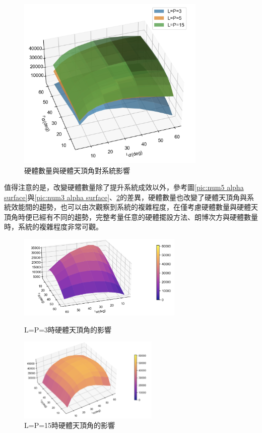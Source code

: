 \begin{figure}[htpb]
    \centering
    \includegraphics[width=9cm]{ch4pic/alpha_effect.png}
    \caption{硬體數量與硬體天頂角對系統影響}
    \label{pic:alpha_effect}
\end{figure}

值得注意的是，改變硬體數量除了提升系統成效以外，參考圖\ref{pic:num5 alpha surface}與\ref{pic:num3 alpha surface}、\ref{pic:num15 alpha surface}的差異，硬體數量也改變了硬體天頂角與系統效能間的趨勢，也可以由次觀察到系統的複雜程度，在僅考慮硬體數量與硬體天頂角時便已經有不同的趨勢，完整考量任意的硬體擺設方法、朗博次方與硬體數量時，系統的複雜程度非常可觀。

\begin{figure}[htpb]
    \centering
    \begin{minipage}{.5\textwidth}
        \centering
        \includegraphics[height=4cm]{ch4pic/num3 alpha surface.png}
        \caption{L=P=3時硬體天頂角的影響}
        \label{pic:num3 alpha surface}
    \end{minipage}%
    \begin{minipage}{0.5\textwidth}
        \centering
        \includegraphics[height=4cm]{ch4pic/num15 alpha surface.png}
        \caption{L=P=15時硬體天頂角的影響}
        \label{pic:num15 alpha surface}
    \end{minipage}
\end{figure}








